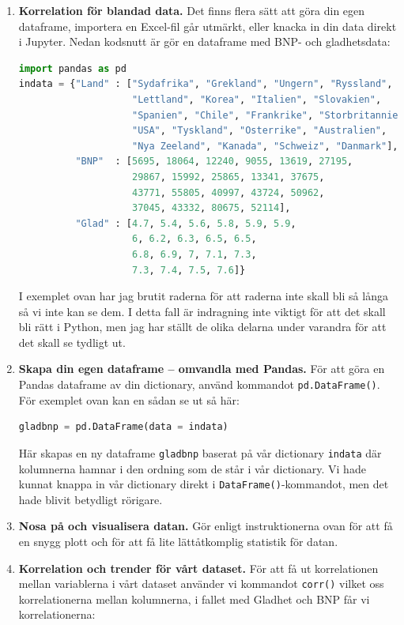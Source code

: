 \documentclass{article}
\begin{document}
\begin{enumerate}
    \item \textbf{Korrelation för blandad data.} Det finns flera sätt att göra din egen dataframe, importera en Excel-fil går utmärkt, eller knacka in din data direkt i Jupyter. Nedan kodsnutt är gör en dataframe med BNP- och gladhetsdata:
\begin{lstlisting}[language=Python]
import pandas as pd
indata = {"Land" : ["Sydafrika", "Grekland", "Ungern", "Ryssland",
                    "Lettland", "Korea", "Italien", "Slovakien",
                    "Spanien", "Chile", "Frankrike", "Storbritannien",
                    "USA", "Tyskland", "Osterrike", "Australien",
                    "Nya Zeeland", "Kanada", "Schweiz", "Danmark"], 
          "BNP"  : [5695, 18064, 12240, 9055, 13619, 27195, 
                    29867, 15992, 25865, 13341, 37675, 
                    43771, 55805, 40997, 43724, 50962, 
                    37045, 43332, 80675, 52114],
          "Glad" : [4.7, 5.4, 5.6, 5.8, 5.9, 5.9, 
                    6, 6.2, 6.3, 6.5, 6.5, 
                    6.8, 6.9, 7, 7.1, 7.3, 
                    7.3, 7.4, 7.5, 7.6]}        
    \end{lstlisting}
    I exemplet ovan har jag brutit raderna för att raderna inte skall bli så långa så vi inte kan se dem. I detta fall är indragning inte viktigt för att det skall bli rätt i Python, men jag har ställt de olika delarna under varandra för att det skall se tydligt ut.
    \item \textbf{Skapa din egen dataframe – omvandla med Pandas.} För att göra en Pandas dataframe av din dictionary, använd kommandot \verb+pd.DataFrame()+. För exemplet ovan kan en sådan se ut så här:
    \begin{lstlisting}[language=Python]
gladbnp = pd.DataFrame(data = indata)        
    \end{lstlisting}
Här skapas en ny dataframe \verb+gladbnp+ baserat på vår dictionary \verb+indata+ där kolumnerna hamnar i den ordning som de står i vår dictionary. Vi hade kunnat knappa in vår dictionary direkt i \verb+DataFrame()+-kommandot, men det hade blivit betydligt rörigare. 
\item \textbf{Nosa på och visualisera datan.} Gör enligt instruktionerna ovan för att få en snygg plott och för att få lite lättåtkomplig statistik för datan. 
\item \textbf{Korrelation och trender för vårt dataset.} För att få ut korrelationen mellan variablerna i vårt dataset använder vi  kommandot \verb+corr()+ vilket oss korrelationerna mellan kolumnerna, i fallet med Gladhet och BNP får vi korrelationerna:

\end{enumerate}
\end{document}
